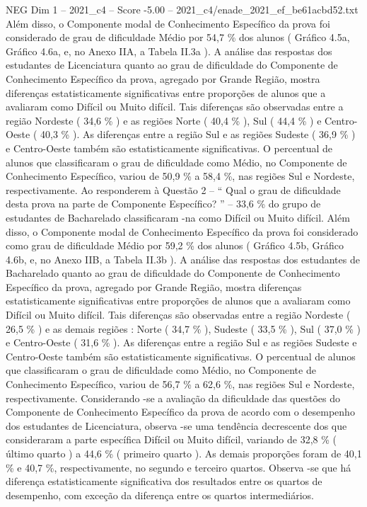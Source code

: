 \begin{textsample}{NEG Dim 1 – 2021\_c4 – Score -5.00 – 2021\_c4/enade\_2021\_ef\_be61acbd52.txt}
Além disso, o Componente modal de Conhecimento Específico da prova foi considerado de grau de dificuldade Médio por 54,7 \% dos alunos ( Gráfico 4.5a, Gráfico 4.6a, e, no Anexo IIA, a Tabela II.3a ).
A análise das respostas dos estudantes de Licenciatura quanto ao grau de dificuldade do Componente de Conhecimento Específico da prova, agregado por Grande Região, mostra diferenças estatisticamente significativas entre proporções de alunos que a avaliaram como Difícil ou Muito difícil.
Tais diferenças são observadas entre a região Nordeste ( 34,6 \% ) e as regiões Norte ( 40,4 \% ), Sul ( 44,4 \% ) e Centro-Oeste ( 40,3 \% ).
As diferenças entre a região Sul e as regiões Sudeste ( 36,9 \% ) e Centro-Oeste também são estatisticamente significativas.
O percentual de alunos que classificaram o grau de dificuldade como Médio, no Componente de Conhecimento Específico, variou de 50,9 \% a 58,4 \%, nas regiões Sul e Nordeste, respectivamente.
Ao responderem à Questão 2 – “ Qual o grau de dificuldade desta prova na parte de Componente Específico? ” – 33,6 \% do grupo de estudantes de Bacharelado classificaram -na como Difícil ou Muito difícil.
Além disso, o Componente modal de Conhecimento Específico da prova foi considerado como grau de dificuldade Médio por 59,2 \% dos alunos ( Gráfico 4.5b, Gráfico 4.6b, e, no Anexo IIB, a Tabela II.3b ).
A análise das respostas dos estudantes de Bacharelado quanto ao grau de dificuldade do Componente de Conhecimento Específico da prova, agregado por Grande Região, mostra diferenças estatisticamente significativas entre proporções de alunos que a avaliaram como Difícil ou Muito difícil.
Tais diferenças são observadas entre a região Nordeste ( 26,5 \% ) e as demais regiões : Norte ( 34,7 \% ), Sudeste ( 33,5 \% ), Sul ( 37,0 \% ) e Centro-Oeste ( 31,6 \% ).
As diferenças entre a região Sul e as regiões Sudeste e Centro-Oeste também são estatisticamente significativas.
O percentual de alunos que classificaram o grau de dificuldade como Médio, no Componente de Conhecimento Específico, variou de 56,7 \% a 62,6 \%, nas regiões Sul e Nordeste, respectivamente.
Considerando -se a avaliação da dificuldade das questões do Componente de Conhecimento Específico da prova de acordo com o desempenho dos estudantes de Licenciatura, observa -se uma tendência decrescente dos que consideraram a parte específica Difícil ou Muito difícil, variando de 32,8 \% ( último quarto ) a 44,6 \% ( primeiro quarto ).
As demais proporções foram de 40,1 \% e 40,7 \%, respectivamente, no segundo e terceiro quartos.
Observa -se que há diferença estatisticamente significativa dos resultados entre os quartos de desempenho, com exceção da diferença entre os quartos intermediários.

\end{textsample}

